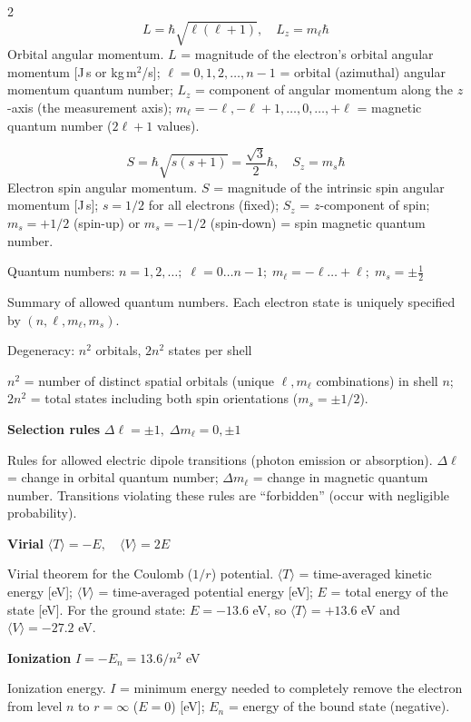 \documentclass[9pt]{extarticle}
\newcommand{\eqlabel}[1]{\textbf{\scriptsize #1}\;}
\newcommand{\desc}[1]{{\small\color{desc}#1}}
\begin{document}
\begin{multicols}{2}
\[L = \hbar\sqrt{\ell(\ell+1)},\quad L_z = m_\ell\hbar\]
\desc{Orbital angular momentum. $L$ = magnitude of the electron's orbital angular momentum [J\,s or kg\,m$^2$/s]; $\ell = 0, 1, 2, \ldots, n-1$ = orbital (azimuthal) angular momentum quantum number; $L_z$ = component of angular momentum along the $z$-axis (the measurement axis); $m_\ell = -\ell, -\ell+1, \ldots, 0, \ldots, +\ell$ = magnetic quantum number ($2\ell + 1$ values).}

\[S = \hbar\sqrt{s(s+1)} = \frac{\sqrt{3}}{2}\hbar,\quad S_z = m_s\hbar\]
\desc{Electron spin angular momentum. $S$ = magnitude of the intrinsic spin angular momentum [J\,s]; $s = 1/2$ for all electrons (fixed); $S_z$ = $z$-component of spin; $m_s = +1/2$ (spin-up) or $m_s = -1/2$ (spin-down) = spin magnetic quantum number.}

Quantum numbers: $n=1,2,\ldots;\; \ell=0\ldots n\!-\!1;\; m_\ell=-\ell\ldots+\ell;\; m_s=\pm\tfrac{1}{2}$

\desc{Summary of allowed quantum numbers. Each electron state is uniquely specified by $(n, \ell, m_\ell, m_s)$.}

Degeneracy: $n^2$ orbitals, $2n^2$ states per shell

\desc{$n^2$ = number of distinct spatial orbitals (unique $\ell, m_\ell$ combinations) in shell $n$; $2n^2$ = total states including both spin orientations ($m_s = \pm 1/2$).}

\eqlabel{Selection rules} $\Delta\ell=\pm1,\;\Delta m_\ell=0,\pm1$

\desc{Rules for allowed electric dipole transitions (photon emission or absorption). $\Delta\ell$ = change in orbital quantum number; $\Delta m_\ell$ = change in magnetic quantum number. Transitions violating these rules are ``forbidden'' (occur with negligible probability).}

\eqlabel{Virial} $\langle T \rangle = -E,\quad \langle V \rangle = 2E$

\desc{Virial theorem for the Coulomb ($1/r$) potential. $\langle T \rangle$ = time-averaged kinetic energy [eV]; $\langle V \rangle$ = time-averaged potential energy [eV]; $E$ = total energy of the state [eV]. For the ground state: $E = -13.6$ eV, so $\langle T \rangle = +13.6$ eV and $\langle V \rangle = -27.2$ eV.}

\eqlabel{Ionization} $I = -E_n = 13.6/n^2$ eV

\desc{Ionization energy. $I$ = minimum energy needed to completely remove the electron from level $n$ to $r = \infty$ ($E = 0$) [eV]; $E_n$ = energy of the bound state (negative).}


\end{multicols}
\end{document}
